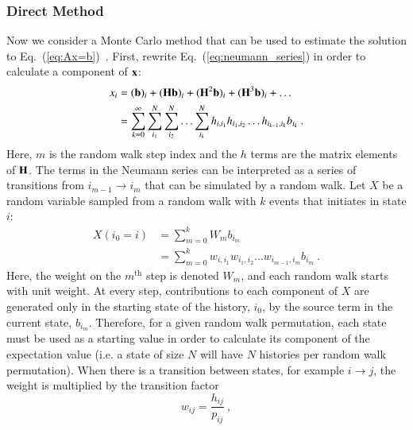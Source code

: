 \documentclass[preprint,12pt]{elsarticle}
\newcommand{\vb}{\ensuremath{\ve{b}}}
\newcommand{\vx}{\ensuremath{\ve{x}}}
\newcommand{\vH}{\ensuremath{\ve{H}}}
\begin{document}
\subsubsection{Direct Method}
\label{sec:direct-method}

Now we consider a Monte Carlo method that can be used to estimate the
solution to Eq.~(\ref{eq:Ax=b})~\cite{hammersley_1964}.  First,
rewrite Eq.~(\ref{eq:neumann_series}) in order to calculate a
component of $\vx$:
\begin{equation}
  \begin{split}
    x_i &= (\vb)_i + (\vH\vb)_i + (\vH^2\vb)_i + (\vH^3\vb)_i +
    \ldots\\ &= \sum_{k=0}^{\infty}\sum_{i_1}^{N}\sum_{i_2}^{N}\ldots
    \sum_{i_k}^{N}h_{i,i_1}h_{i_1,i_2}\ldots h_{i_{k-1},i_k}b_{i_k}\:.
  \end{split}
  \label{eq:neumann_series_i}
\end{equation}
Here, $m$ is the random walk step index and the $h$ terms are the matrix
elements of $\vH$.  The terms in the Neumann series can be interpreted as a
series of transitions from $i_{m-1}\rightarrow i_m$ that can be simulated by a
random walk.  Let $X$ be a random variable sampled from a random walk with $k$
events that initiates in state $i$:
\begin{equation}
  \begin{split}
    X(i_0 = i) &= \sum_{m=0}^{k}W_m b_{i_m}\\ &=
    \sum_{m=0}^{k}w_{i,i_1}w_{i_1,i_2}\ldots w_{i_{m-1},i_m}b_{i_m}\:.
  \end{split}
  \label{eq:estimator_xi}
\end{equation}
Here, the weight on the $m^\text{th}$ step is denoted $W_m$, and each
random walk starts with unit weight. At every step, contributions to
each component of $X$ are generated only in the starting state of the
history, $i_0$, by the source term in the current state,
$b_{i_m}$. Therefore, for a given random walk permutation, each state
must be used as a starting value in order to calculate its component
of the expectation value (i.e. a state of size $N$ will have $N$
histories per random walk permutation). When there is a transition
between states, for example $i\rightarrow j$, the weight is multiplied
by the transition factor
\begin{equation}
  w_{ij} = \frac{h_{ij}}{p_{ij}}\:,
  \label{eq:weight}
\end{equation}
\end{document}
